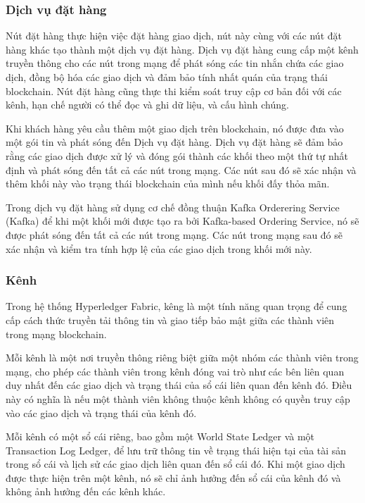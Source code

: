 \subsubsection{Dịch vụ đặt hàng}
Nút đặt hàng thực hiện việc đặt hàng giao dịch, nút này 
cùng với các nút đặt hàng khác tạo thành một dịch vụ đặt hàng.
Dịch vụ đặt hàng cung cấp một kênh truyền thông cho 
các nút trong mạng để phát sóng các tin nhắn chứa các giao 
dịch, đồng bộ hóa các giao dịch và đảm bảo tính nhất quán 
của trạng thái blockchain.
Nút đặt hàng cũng thực thi kiểm soát truy cập cơ bản đối với 
các kênh, hạn chế người có thể đọc và ghi dữ liệu, và cấu hình chúng.\cite{hyperledger1}

Khi khách hàng yêu cầu thêm một giao dịch trên blockchain, 
nó được đưa vào một gói tin và phát sóng đến Dịch vụ đặt 
hàng. Dịch vụ đặt hàng sẽ đảm bảo rằng các giao dịch được 
xử lý và đóng gói thành các khối theo một thứ tự nhất định 
và phát sóng đến tất cả các nút trong mạng. Các nút sau đó 
sẽ xác nhận và thêm khối này vào trạng thái blockchain của 
mình nếu khối đấy thỏa mãn.

Trong dịch vụ đặt hàng sử dụng cơ chế đồng thuận Kafka Orderering Service (Kafka) để khi một 
khối mới được tạo ra bởi Kafka-based Ordering Service, nó sẽ được phát sóng đến tất cả các nút trong mạng. Các nút trong mạng sau đó sẽ xác nhận và kiểm tra tính hợp lệ của các giao dịch trong khối mới này.


\subsubsection{Kênh}

Trong hệ thống Hyperledger Fabric, kêng là một tính năng quan trọng để cung cấp cách thức 
truyền tải thông tin và giao tiếp bảo mật giữa các thành viên trong mạng blockchain.

Mỗi kênh là một nơi truyền thông riêng biệt giữa một nhóm các thành viên trong mạng, 
cho phép các thành viên trong kênh đóng vai trò như các bên liên quan duy nhất đến các giao 
dịch và trạng thái của sổ cái liên quan đến kênh đó. Điều này có nghĩa là nếu một thành 
viên không thuộc kênh không có quyền truy cập vào các giao dịch và trạng thái của kênh đó.

Mỗi kênh có một sổ cái riêng, bao gồm một World State Ledger và một Transaction Log Ledger, 
để lưu trữ thông tin về trạng thái hiện tại của tài sản trong sổ cái và lịch sử các giao dịch liên quan đến 
sổ cái đó. Khi một giao dịch được thực hiện trên một kênh, nó sẽ chỉ ảnh hưởng đến sổ cái 
của kênh đó và không ảnh hưởng đến các kênh khác.

